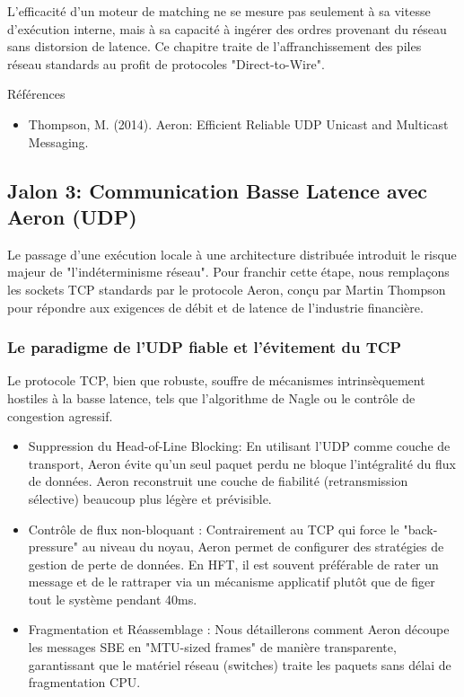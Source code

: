 L'efficacité d'un moteur de matching ne se mesure pas seulement à sa vitesse d'exécution interne, mais à sa capacité à ingérer des ordres provenant du réseau sans distorsion de latence. Ce chapitre traite de l'affranchissement des piles réseau standards au profit de protocoles "Direct-to-Wire".

Références

\begin{itemize}
    \item Thompson, M. (2014). Aeron: Efficient Reliable UDP Unicast and Multicast Messaging.
\end{itemize}

\subsection{Jalon 3: Communication Basse Latence avec Aeron (UDP)}

Le passage d'une exécution locale à une architecture distribuée introduit le risque majeur de "l'indéterminisme réseau". Pour franchir cette étape, nous remplaçons les sockets TCP standards par le protocole Aeron, conçu par Martin Thompson pour répondre aux exigences de débit et de latence de l'industrie financière.

\subsubsection{Le paradigme de l'UDP fiable et l'évitement du TCP}

Le protocole TCP, bien que robuste, souffre de mécanismes intrinsèquement hostiles à la basse latence, tels que l'algorithme de Nagle ou le contrôle de congestion agressif.

\begin{itemize}
    \item Suppression du Head-of-Line Blocking: En utilisant l'UDP comme couche de transport, Aeron évite qu'un seul paquet perdu ne bloque l'intégralité du flux de données. Aeron reconstruit une couche de fiabilité (retransmission sélective) beaucoup plus légère et prévisible.
    \item Contrôle de flux non-bloquant : Contrairement au TCP qui force le "back-pressure" au niveau du noyau, Aeron permet de configurer des stratégies de gestion de perte de données. En HFT, il est souvent préférable de rater un message et de le rattraper via un mécanisme applicatif plutôt que de figer tout le système pendant 40ms.
    \item Fragmentation et Réassemblage : Nous détaillerons comment Aeron découpe les messages SBE en "MTU-sized frames" de manière transparente, garantissant que le matériel réseau (switches) traite les paquets sans délai de fragmentation CPU.
\end{itemize}

